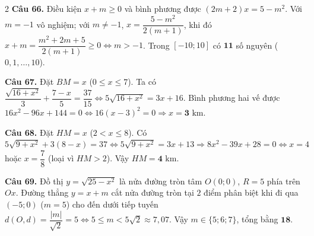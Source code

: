 \documentclass[12pt,a4paper]{article}
\begin{document}
\begin{multicols}{2}
\textbf{Câu 66.} Điều kiện $x + m \ge 0$ và bình phương được $(2m + 2)x = 5 - m^2$. Với $m = -1$ vô nghiệm; với $m \ne -1$, $x = \dfrac{5 - m^2}{2(m + 1)}$, khi đó $x + m = \dfrac{m^2 + 2m + 5}{2(m + 1)} \ge 0 \Leftrightarrow m > -1$. Trong $[-10; 10]$ có $\mathbf{11}$ số nguyên ($0, 1, \dots, 10$).\par\vspace{3pt}

\textbf{Câu 67.} Đặt $BM = x$ ($0 \le x \le 7$). Ta có $\dfrac{\sqrt{16 + x^2}}{3} + \dfrac{7 - x}{5} = \dfrac{37}{15} \Leftrightarrow 5\sqrt{16 + x^2} = 3x + 16$. Bình phương hai vế được $16x^2 - 96x + 144 = 0 \Leftrightarrow 16(x - 3)^2 = 0 \Rightarrow x = \mathbf{3}\text{ km}$.\par\vspace{3pt}

\textbf{Câu 68.} Đặt $HM = x$ ($2 < x \le 8$). Có $5\sqrt{9 + x^2} + 3(8 - x) = 37 \Leftrightarrow 5\sqrt{9 + x^2} = 3x + 13 \Rightarrow 8x^2 - 39x + 28 = 0 \Leftrightarrow x = 4$ hoặc $x = \dfrac{7}{8}$ (loại vì $HM > 2$). Vậy $HM = \mathbf{4}\text{ km}$.\par\vspace{3pt}

\textbf{Câu 69.} Đồ thị $y = \sqrt{25 - x^2}$ là nửa đường tròn tâm $O(0; 0)$, $R = 5$ phía trên $Ox$. Đường thẳng $y = x + m$ cắt nửa đường tròn tại $2$ điểm phân biệt khi đi qua $(-5; 0)$ ($m = 5$) cho đến dưới tiếp tuyến $d(O, d) = \dfrac{|m|}{\sqrt{2}} = 5 \Leftrightarrow 5 \le m < 5\sqrt{2} \approx 7{,}07$. Vậy $m \in \{5; 6; 7\}$, tổng bằng $\mathbf{18}$.\par\noindent\begin{minipage}{\linewidth}\centering\vspace{3pt}\vspace{2pt}\end{minipage}\par\vspace{3pt}


\end{multicols}
\end{document}
